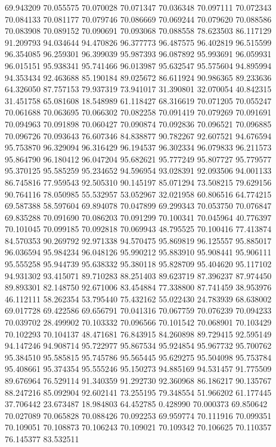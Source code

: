 69.943209
70.055575
70.070028
70.071347
70.036348
70.097111
70.072343
70.084133
70.081177
70.079746
70.086669
70.069244
70.079620
70.088586
70.083908
70.089152
70.090691
70.093068
70.088558
78.623503
86.117129
91.209793
94.034644
94.470826
96.377773
96.487575
96.402819
96.515599
96.354085
96.259301
96.399039
95.987393
96.087892
95.993691
96.059931
96.015151
95.938341
95.741466
96.013987
95.632547
95.575604
94.895994
94.353434
92.463688
85.190184
89.025672
86.611924
90.986365
89.233636
64.326050
87.757153
79.937319
73.941017
31.390801
32.070054
40.842315
31.451758
65.081608
18.548989
61.118427
68.316619
70.071205
70.055247
70.061688
70.063695
70.066302
70.082258
70.091419
70.079269
70.091691
70.094963
70.091898
70.060427
70.090874
70.092836
70.096521
70.096885
70.096726
70.093643
76.607346
84.838877
90.782267
92.607521
94.676594
95.753870
96.329094
96.316429
96.194537
96.302334
96.079833
96.211573
95.864790
96.180412
96.047204
95.682621
95.777249
95.807727
95.779577
95.370125
95.585259
95.234652
94.596954
93.028391
92.093506
94.001133
86.745816
77.959543
92.505310
90.145197
85.071294
73.508215
79.629156
90.764116
78.050985
55.532957
53.052967
32.021958
60.806516
64.774215
69.587388
58.597604
69.894078
70.047899
69.299343
70.053750
70.076847
69.835288
70.091690
70.086203
70.091299
70.100341
70.045964
40.776397
70.101045
70.099185
70.092818
70.069943
48.795525
70.100416
77.413874
84.570353
90.269792
92.971338
94.570475
95.869819
96.125557
95.885017
96.036594
95.984234
96.048126
95.990212
95.883910
95.908441
95.906111
95.555258
95.944739
95.638332
95.380118
95.828709
95.404620
95.117102
94.931302
93.415071
89.710283
88.251403
89.623719
87.396237
87.974450
89.893301
82.148750
92.671006
83.454884
77.338800
87.741459
38.953976
46.112111
58.262354
53.795440
75.432162
55.022430
24.783939
68.638002
69.017728
69.422586
69.656791
70.041316
70.067759
70.076239
70.094233
70.039702
28.499902
70.103332
70.096566
70.101542
70.068901
70.103429
70.102293
70.104137
48.471681
76.843915
84.260898
89.729415
92.595149
94.147246
94.908714
95.722977
95.867534
95.924854
95.967732
95.700762
95.384510
95.585815
95.745786
95.565445
95.629275
95.504098
95.753784
95.408661
95.374354
95.555246
95.150273
94.885169
94.531457
91.775509
89.676964
76.529114
91.340359
91.292730
92.360968
86.186217
90.135767
88.247216
85.092904
92.602141
73.255195
79.348554
51.966202
61.177445
37.706442
23.673487
18.984803
64.452785
0.428990
70.000373
69.850642
70.027089
70.065828
70.088426
70.092253
69.959774
70.111916
70.099351
70.109051
70.108873
70.106243
70.109021
70.109342
70.106625
70.110357
76.145377
83.532511
